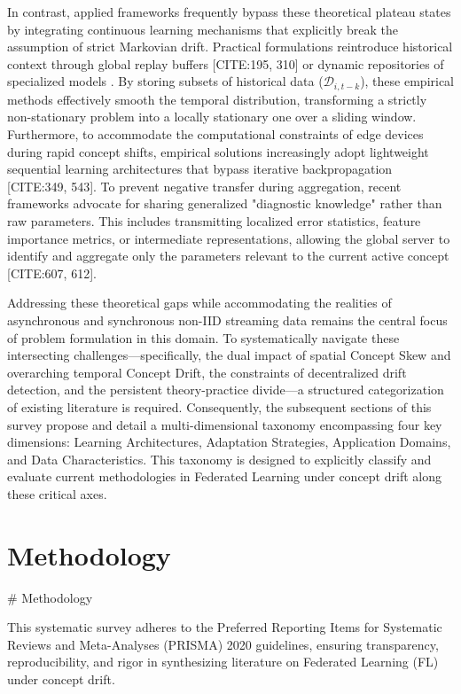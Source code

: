 \documentclass[journal]{IEEEtran}
\begin{document}
In contrast, applied frameworks frequently bypass these theoretical plateau states by integrating continuous learning mechanisms that explicitly break the assumption of strict Markovian drift. Practical formulations reintroduce historical context through global replay buffers [CITE:195, 310] or dynamic repositories of specialized models \cite{Tsiporkova2023}. By storing subsets of historical data ($\mathcal{D}_{i, t-k}$), these empirical methods effectively smooth the temporal distribution, transforming a strictly non-stationary problem into a locally stationary one over a sliding window. Furthermore, to accommodate the computational constraints of edge devices during rapid concept shifts, empirical solutions increasingly adopt lightweight sequential learning architectures that bypass iterative backpropagation [CITE:349, 543]. To prevent negative transfer during aggregation, recent frameworks advocate for sharing generalized "diagnostic knowledge" rather than raw parameters. This includes transmitting localized error statistics, feature importance metrics, or intermediate representations, allowing the global server to identify and aggregate only the parameters relevant to the current active concept [CITE:607, 612].

Addressing these theoretical gaps while accommodating the realities of asynchronous and synchronous non-IID streaming data remains the central focus of problem formulation in this domain. To systematically navigate these intersecting challenges—specifically, the dual impact of spatial Concept Skew and overarching temporal Concept Drift, the constraints of decentralized drift detection, and the persistent theory-practice divide—a structured categorization of existing literature is required. Consequently, the subsequent sections of this survey propose and detail a multi-dimensional taxonomy encompassing four key dimensions: Learning Architectures, Adaptation Strategies, Application Domains, and Data Characteristics. This taxonomy is designed to explicitly classify and evaluate current methodologies in Federated Learning under concept drift along these critical axes.

\section{Methodology}
\label{sec:methodology}

\# Methodology

This systematic survey adheres to the Preferred Reporting Items for Systematic Reviews and Meta-Analyses (PRISMA) 2020 guidelines, ensuring transparency, reproducibility, and rigor in synthesizing literature on Federated Learning (FL) under concept drift.
\end{document}
